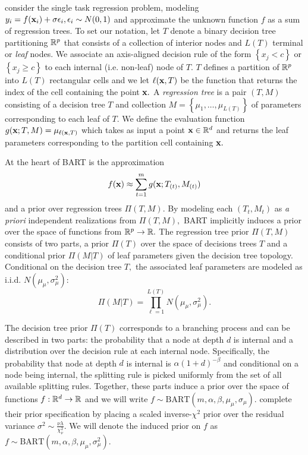 \documentclass[12pt]{article}
\begin{document}
\citet{Chipman2010} consider the single task regression problem, modeling $y_{i} = f(\mathbf{x}_{i}) + \sigma\epsilon_{i}, \epsilon_{i} \sim N(0,1)$ and approximate the unknown function $f$ as a sum of regression trees.
To set our notation, let $T$ denote a binary decision tree partitioning $\mathbb{R}^{p}$ that consists of a collection of interior nodes and $L(T)$ terminal or \textit{leaf} nodes. 
We associate an axis-aligned decision rule of the form $\left\{x_{j} < c \right\}$ or $\left\{x_{j} \geq c \right\}$ to each internal (i.e. non-leaf) node of $T.$
$T$ defines a partition of $\mathbb{R}^{p}$ into $L(T)$ rectangular cells and we let $\ell(\mathbf{x},T)$ be the function that returns the index of the cell containing the point $\mathbf{x}.$
A \textit{regression tree} is a pair $(T,M)$ consisting of a decision tree $T$ and collection $M = \left\{\mu_{1}, \ldots, \mu_{L(T)}\right\}$ of parameters corresponding to each leaf of $T.$
We define the evaluation function $g(\mathbf{x}; T,M) = \mu_{\ell(\mathbf{x},T)}$ which takes as input a point $\mathbf{x} \in \mathbb{R}^{d}$ and returns the leaf parameters corresponding to the partition cell containing $\mathbf{x}.$

At the heart of BART is the approximation
$$
f(\mathbf{x}) \approx \sum_{t = 1}^{m}{g(\mathbf{x}; T_{(t)}, M_{(t)})}
$$
and a prior over regression trees $\Pi(T,M).$
By modeling each $(T_{t}, M_{t})$ as \textit{a priori} independent realizations from $\Pi(T,M),$ BART implicitly induces a prior over the space of functions from $\mathbb{R}^{p} \rightarrow \mathbb{R}.$
The regression tree prior $\Pi(T,M)$ consists of two parts, a prior $\Pi(T)$ over the space of decisions trees $T$ and a conditional prior $\Pi(M | T)$ of leaf parameters given the decision tree topology.
Conditional on the decision tree $T,$ the associated leaf parameters are modeled as i.i.d. $N(\mu_{\mu}, \sigma^{2}_{\mu}):$ 
$$
\Pi(M | T) = \prod_{\ell = 1}^{L(T)}N(\mu_{\mu}, \sigma^{2}_{\mu}).
$$


The decision tree prior $\Pi(T)$ corresponds to a branching process and can be described in two parts: the probability that a node at depth $d$ is internal and a distribution over the decision rule at each internal node.
Specifically, the probability that node at depth $d$ is internal is $\alpha(1 + d)^{-\beta}$ and conditional on a node being internal, the splitting rule is picked uniformly from the set of all available splitting rules.
Together, these parts induce a prior over the space of functions $f: \mathbb{R}^{d} \rightarrow \mathbb{R}$ and we will write $f \sim \text{BART}(m, \alpha, \beta, \mu_{\mu}, \sigma_{\mu}).$
\citet{Chipman2010} complete their prior specification by placing a scaled inverse-$\chi^{2}$ prior over the residual variance $\sigma^{2} \sim \frac{\nu\lambda}{\chi^{2}_{\nu}}.$
We will denote the induced prior on $f$ as $f \sim \text{BART}(m, \alpha, \beta, \mu_{\mu}, \sigma^{2}_{\mu}).$ 
\end{document}
